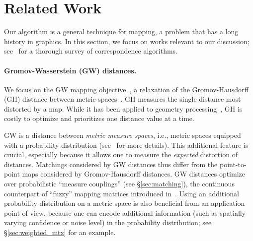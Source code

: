 
\section{Related Work}\label{sec:related_work}

Our algorithm is a general technique for mapping, a problem that has a long history in graphics. In this section, we focus on works relevant to our discussion; see~\cite{kaick-2011} for a thorough survey of correspondence algorithms.


\paragraph*{Gromov-Wasserstein (GW) distances.}  

We focus on the GW mapping objective~\cite{memoli-2007}, a relaxation of the Gromov-Hausdorff (GH) distance between metric spaces~\cite{gromov-2001}. GH measures the single distance most distorted by a map.  While it has been applied to geometry processing~\cite{bronstein-2010}, GH is costly to optimize and prioritizes one distance value at a time.%


GW is a distance between \emph{metric measure spaces}, i.e., metric spaces equipped with a probability distribution (see~\cite{memoli-2011,memoli-2014,SturmGW} for more details). This additional feature is crucial, especially because it allows one to measure the \emph{expected} distortion of distances. Matchings considered by GW distances thus differ from the point-to-point maps considered by Gromov-Hausdorff distances. GW distances optimize over probabilistic ``measure couplings'' (see \S\ref{sec:matching}), the continuous counterpart of ``fuzzy'' mapping matrices introduced in~\cite{kim-2012,solomon-2012}.
% 
Using an additional probability distribution on a metric space is also beneficial from an application point of view, because one can encode additional information (such as spatially varying confidence or noise level) in the probability distribution; see \S\ref{sec:weighted_mtx} for an example.



